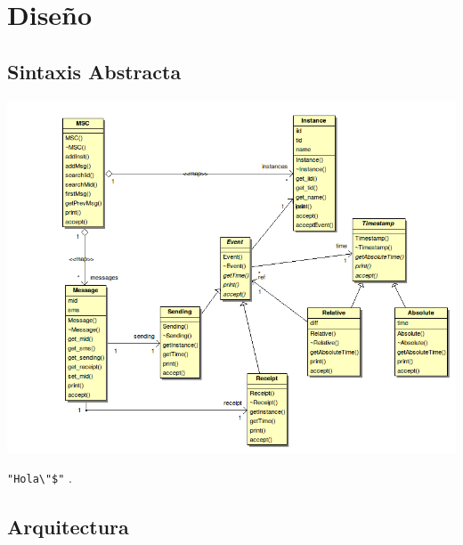 \chapter{Diseño}
\label{ch:diseno}

\section{Sintaxis Abstracta}

\includegraphics[scale=0.5]{./images/fig2}


\verb~"Hola\"$"~ .

\section{Arquitectura}

